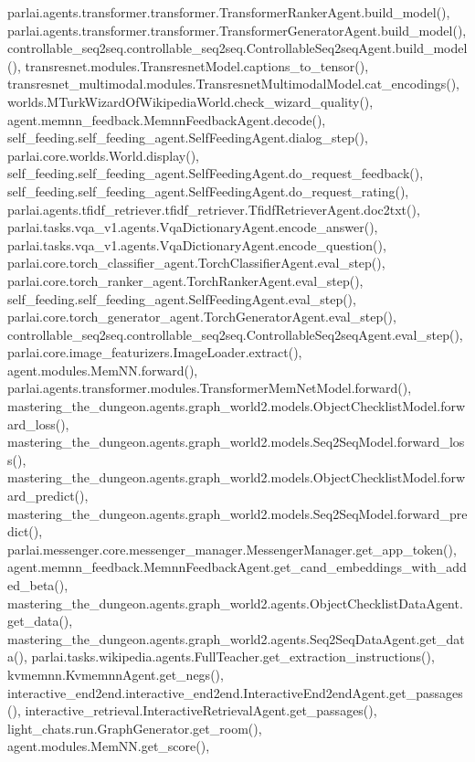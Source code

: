 parlai.\+agents.\+transformer.\+transformer.\+Transformer\+Ranker\+Agent.\+build\+\_\+model(), parlai.\+agents.\+transformer.\+transformer.\+Transformer\+Generator\+Agent.\+build\+\_\+model(), controllable\+\_\+seq2seq.\+controllable\+\_\+seq2seq.\+Controllable\+Seq2seq\+Agent.\+build\+\_\+model(), transresnet.\+modules.\+Transresnet\+Model.\+captions\+\_\+to\+\_\+tensor(), transresnet\+\_\+multimodal.\+modules.\+Transresnet\+Multimodal\+Model.\+cat\+\_\+encodings(), worlds.\+M\+Turk\+Wizard\+Of\+Wikipedia\+World.\+check\+\_\+wizard\+\_\+quality(), agent.\+memnn\+\_\+feedback.\+Memnn\+Feedback\+Agent.\+decode(), self\+\_\+feeding.\+self\+\_\+feeding\+\_\+agent.\+Self\+Feeding\+Agent.\+dialog\+\_\+step(), parlai.\+core.\+worlds.\+World.\+display(), self\+\_\+feeding.\+self\+\_\+feeding\+\_\+agent.\+Self\+Feeding\+Agent.\+do\+\_\+request\+\_\+feedback(), self\+\_\+feeding.\+self\+\_\+feeding\+\_\+agent.\+Self\+Feeding\+Agent.\+do\+\_\+request\+\_\+rating(), parlai.\+agents.\+tfidf\+\_\+retriever.\+tfidf\+\_\+retriever.\+Tfidf\+Retriever\+Agent.\+doc2txt(), parlai.\+tasks.\+vqa\+\_\+v1.\+agents.\+Vqa\+Dictionary\+Agent.\+encode\+\_\+answer(), parlai.\+tasks.\+vqa\+\_\+v1.\+agents.\+Vqa\+Dictionary\+Agent.\+encode\+\_\+question(), parlai.\+core.\+torch\+\_\+classifier\+\_\+agent.\+Torch\+Classifier\+Agent.\+eval\+\_\+step(), parlai.\+core.\+torch\+\_\+ranker\+\_\+agent.\+Torch\+Ranker\+Agent.\+eval\+\_\+step(), self\+\_\+feeding.\+self\+\_\+feeding\+\_\+agent.\+Self\+Feeding\+Agent.\+eval\+\_\+step(), parlai.\+core.\+torch\+\_\+generator\+\_\+agent.\+Torch\+Generator\+Agent.\+eval\+\_\+step(), controllable\+\_\+seq2seq.\+controllable\+\_\+seq2seq.\+Controllable\+Seq2seq\+Agent.\+eval\+\_\+step(), parlai.\+core.\+image\+\_\+featurizers.\+Image\+Loader.\+extract(), agent.\+modules.\+Mem\+N\+N.\+forward(), parlai.\+agents.\+transformer.\+modules.\+Transformer\+Mem\+Net\+Model.\+forward(), mastering\+\_\+the\+\_\+dungeon.\+agents.\+graph\+\_\+world2.\+models.\+Object\+Checklist\+Model.\+forward\+\_\+loss(), mastering\+\_\+the\+\_\+dungeon.\+agents.\+graph\+\_\+world2.\+models.\+Seq2\+Seq\+Model.\+forward\+\_\+loss(), mastering\+\_\+the\+\_\+dungeon.\+agents.\+graph\+\_\+world2.\+models.\+Object\+Checklist\+Model.\+forward\+\_\+predict(), mastering\+\_\+the\+\_\+dungeon.\+agents.\+graph\+\_\+world2.\+models.\+Seq2\+Seq\+Model.\+forward\+\_\+predict(), parlai.\+messenger.\+core.\+messenger\+\_\+manager.\+Messenger\+Manager.\+get\+\_\+app\+\_\+token(), agent.\+memnn\+\_\+feedback.\+Memnn\+Feedback\+Agent.\+get\+\_\+cand\+\_\+embeddings\+\_\+with\+\_\+added\+\_\+beta(), mastering\+\_\+the\+\_\+dungeon.\+agents.\+graph\+\_\+world2.\+agents.\+Object\+Checklist\+Data\+Agent.\+get\+\_\+data(), mastering\+\_\+the\+\_\+dungeon.\+agents.\+graph\+\_\+world2.\+agents.\+Seq2\+Seq\+Data\+Agent.\+get\+\_\+data(), parlai.\+tasks.\+wikipedia.\+agents.\+Full\+Teacher.\+get\+\_\+extraction\+\_\+instructions(), kvmemnn.\+Kvmemnn\+Agent.\+get\+\_\+negs(), interactive\+\_\+end2end.\+interactive\+\_\+end2end.\+Interactive\+End2end\+Agent.\+get\+\_\+passages(), interactive\+\_\+retrieval.\+Interactive\+Retrieval\+Agent.\+get\+\_\+passages(), light\+\_\+chats.\+run.\+Graph\+Generator.\+get\+\_\+room(), agent.\+modules.\+Mem\+N\+N.\+get\+\_\+score(), 